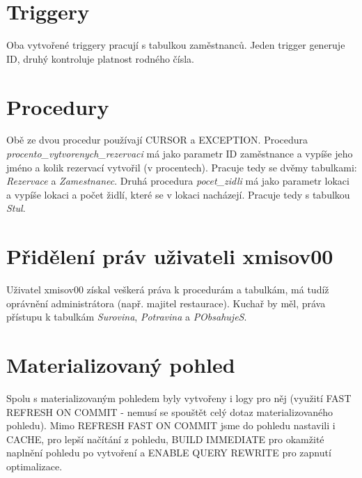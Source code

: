 \documentclass[11pt, a4paper]{article}[]
\begin{document}
    \section{Triggery}
    Oba vytvořené triggery pracují s tabulkou zaměstnanců. Jeden trigger generuje
    ID, druhý kontroluje platnost rodného čísla.

    \section{Procedury}
    Obě ze dvou procedur používají CURSOR a EXCEPTION. Procedura  \textit{procento\_vytvorenych\_rezervaci}
    má jako parametr ID zaměstnance a vypíše jeho jméno a kolik rezervací vytvořil
    (v procentech). Pracuje tedy se dvěmy tabulkami: \textit{Rezervace} a \textit{Zamestnanec}.
    Druhá procedura \textit{pocet\_zidli} má jako parametr lokaci a vypíše
    lokaci a počet židlí, které se v lokaci nacházejí. Pracuje tedy s tabulkou
    \textit{Stul}.

    \section{Přidělení práv uživateli xmisov00}
    Uživatel xmisov00 získal veškerá práva k procedurám a tabulkám, má tudíž
    oprávnění administrátora (např. majitel restaurace). Kuchař by měl, práva
    přístupu k tabulkám \textit{Surovina}, \textit{Potravina} a \textit{PObsahujeS}.

    \section{Materializovaný pohled}
    Spolu s materializovaným pohledem byly vytvořeny i logy pro něj (využití
    FAST REFRESH ON COMMIT - nemusí se spouštět celý dotaz materializovaného
    pohledu). Mimo REFRESH FAST ON COMMIT jsme do pohledu nastavili i CACHE,
    pro lepší načítání z pohledu, BUILD IMMEDIATE pro okamžité naplnění pohledu
    po vytvoření a ENABLE QUERY REWRITE pro zapnutí optimalizace.
\end{document}
